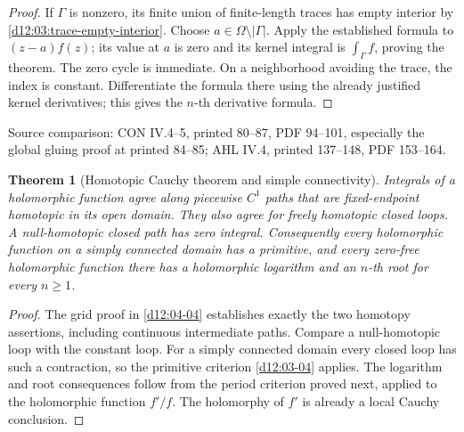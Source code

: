 \documentclass[11pt,a4paper,openany]{book}
\newtheorem{theorem}{Theorem}[chapter]
\theoremstyle{definition}
\theoremstyle{remark}\newtheorem{remark}[theorem]{Remark}
\newcommand{\family}[1]{}
\newcommand{\source}[1]{\par\begingroup\small\sffamily\color{black!65}Source comparison: #1\par\endgroup}
\begin{document}
\begin{proof}
If \(\Gamma\) is nonzero, its finite union of finite-length traces has
empty interior by \cref{d12:03:trace-empty-interior}. Choose
\(a\in\Omega\setminus|\Gamma|\).
Apply the established formula to \((z-a)f(z)\); its value at \(a\)
is zero and its kernel integral is \(\int_\Gamma f\), proving the
theorem. The zero cycle is immediate.
On a neighborhood avoiding the trace, the index is constant. Differentiate
the formula there using the already justified kernel derivatives;
this gives the \(n\)-th derivative formula.
\end{proof}
\source{CON IV.4--5, printed 80--87, PDF 94--101, especially the global gluing proof at printed 84--85; AHL IV.4, printed 137--148, PDF 153--164.}

\begin{theorem}[Homotopic Cauchy theorem and simple connectivity]\family{D12.04.06}\label{d12:04-06}
Integrals of a holomorphic function agree along piecewise \(C^1\) paths
that are fixed-endpoint homotopic in its open domain. They also agree
for freely homotopic closed loops. A null-homotopic closed path has zero
integral. Consequently every holomorphic function on a simply connected
domain has a primitive, and every zero-free holomorphic function there
has a holomorphic logarithm and an \(n\)-th root for every \(n\ge1\).
\end{theorem}
\begin{proof}
The grid proof in \cref{d12:04-04} establishes exactly the two homotopy
assertions, including continuous intermediate paths.
Compare a null-homotopic loop with the constant loop.
For a simply connected domain every closed loop has such a contraction,
so the primitive criterion \cref{d12:03-04} applies.
The logarithm and root consequences follow from the period criterion
proved next, applied to the holomorphic function \(f'/f\).
The holomorphy of \(f'\) is already a local Cauchy conclusion.
\end{proof}
\end{document}
